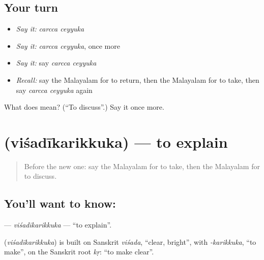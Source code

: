 \subsection*{Your turn}
\begin{itemize}
\raggedright
  \item \emph{Say it:} \emph{carcca ceyyuka}
  \item \emph{Say it:} \emph{carcca ceyyuka}, once more
  \item \emph{Say it:} say \emph{carcca ceyyuka}
  \item \emph{Recall:} say the Malayalam for to return, then the Malayalam for to take, then say \emph{carcca ceyyuka} again
\end{itemize}

\begin{tcolorbox}[breakable,colback=teal!4,colframe=teal!35!black,title={Before you move on}]
What does   mean? (\textquotedblleft{}To discuss\textquotedblright{}.) Say it once more.
\end{tcolorbox}
\section[\texorpdfstring{\ml{വിശദീകരിക്കുക} (viśadīkarikkuka)}{വിശദീകരിക്കുക (viśadīkarikkuka)}]{ (viśadīkarikkuka) — to explain}

\label{lesson:ML-C226-visadikarikkuka}



\begin{quote}
Before the new one: say the Malayalam for to take, then the Malayalam for to discuss.
\end{quote}

\subsection*{You'll want to know: }
\textbf{} — \emph{viśadīkarikkuka} — \textquotedblleft{}to explain\textquotedblright{}.

\begin{cousinweb}
\textbf{} (\emph{viśadīkarikkuka}) is built on Sanskrit \emph{viśada}, \textquotedblleft{}clear, bright\textquotedblright{}, with \emph{-karikkuka}, \textquotedblleft{}to make\textquotedblright{}, on the Sanskrit root \emph{kṛ}: \textquotedblleft{}to make clear\textquotedblright{}.
\end{cousinweb}

